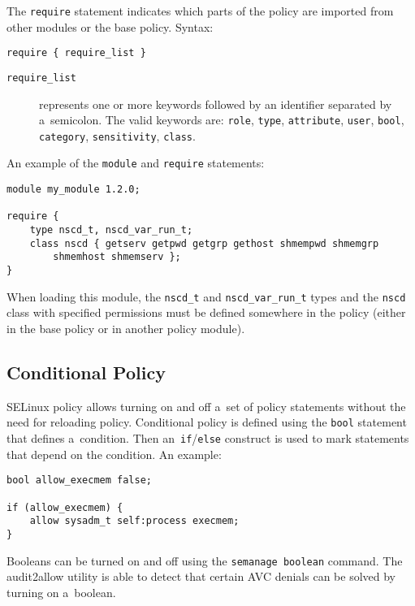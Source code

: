 The \texttt{require} statement indicates which parts of the policy are imported
from other modules or the base policy. Syntax:
\begin{lstlisting}[language=te]
require { require_list }
\end{lstlisting}
\begin{description}
    \item [\texttt{require\_list}] represents one or more keywords followed by
        an identifier separated by a~semicolon. The valid keywords are:
        \texttt{role}, \texttt{type}, \texttt{attribute}, \texttt{user},
        \texttt{bool}, \texttt{category}, \texttt{sensitivity}, \texttt{class}.
\end{description}

An example of the \texttt{module} and \texttt{require} statements:
\begin{lstlisting}[language=te]
module my_module 1.2.0;

require {
    type nscd_t, nscd_var_run_t;
    class nscd { getserv getpwd getgrp gethost shmempwd shmemgrp
        shmemhost shmemserv };
}
\end{lstlisting}
When loading this module, the \texttt{nscd\_t} and \texttt{nscd\_var\_run\_t}
types and the \texttt{nscd} class with specified permissions must be defined
somewhere in the policy (either in the base policy or in another policy module).

\subsection{Conditional Policy}
\label{booleans}
SELinux policy allows turning on and off a~set of policy statements without the
need for reloading policy. Conditional policy is defined using the \texttt{bool}
statement that defines a~condition. Then an~\texttt{if}/\texttt{else} construct
is used to mark statements that depend on the condition. An example:
\begin{lstlisting}[language=te]
bool allow_execmem false;

if (allow_execmem) {
    allow sysadm_t self:process execmem;
}
\end{lstlisting}
Booleans can be turned on and off using the \texttt{semanage boolean} command.
The audit2allow utility is able to detect that certain AVC denials can be solved
by turning on a~boolean.

